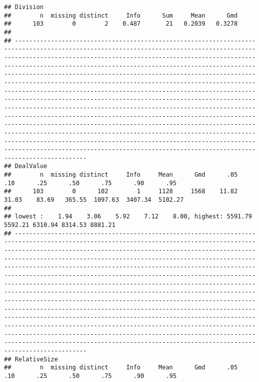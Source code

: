 \documentclass[]{article}
\begin{document}
\begin{verbatim}
## Division 
##        n  missing distinct     Info      Sum     Mean      Gmd 
##      103        0        2    0.487       21   0.2039   0.3278 
## 
## ----------------------------------------------------------------------------------------------------------------------------------------------------------------------------------------------------------------------------------------------------------------------------------------------------------------------------------------------------------------------------------------------------------------------------------------------------------------------------------------------------------------------------------------------------------------------------------------------------------------------------------------------------------------------------------------------------------------------------------------------------------------------------------------------------------------------------------------------------------------------------------------------------------------------------------------------------------------------------------------------------------------------------------------
## DealValue 
##        n  missing distinct     Info     Mean      Gmd      .05      .10      .25      .50      .75      .90      .95 
##      103        0      102        1     1128     1568    11.82    31.03    83.69   365.55  1097.63  3407.34  5102.27 
## 
## lowest :    1.94    3.06    5.92    7.12    8.00, highest: 5591.79 5592.21 6310.94 8314.53 8881.21
## ----------------------------------------------------------------------------------------------------------------------------------------------------------------------------------------------------------------------------------------------------------------------------------------------------------------------------------------------------------------------------------------------------------------------------------------------------------------------------------------------------------------------------------------------------------------------------------------------------------------------------------------------------------------------------------------------------------------------------------------------------------------------------------------------------------------------------------------------------------------------------------------------------------------------------------------------------------------------------------------------------------------------------------------
## RelativeSize 
##        n  missing distinct     Info     Mean      Gmd      .05      .10      .25      .50      .75      .90      .95 

\end{verbatim}
\end{document}
